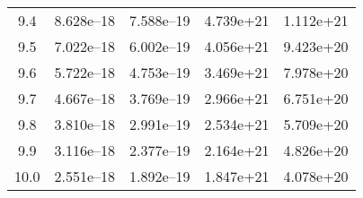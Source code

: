 \documentclass[a4paper,fleqn,usenatbib]{mnras}
\begin{document}
\begin{table*}
\begin{tabular}{ccccc}
    9.4 & 8.628e--18 & 7.588e--19 & 4.739e+21 & 1.112e+21 \\
    9.5 & 7.022e--18 & 6.002e--19 & 4.056e+21 & 9.423e+20 \\
    9.6 & 5.722e--18 & 4.753e--19 & 3.469e+21 & 7.978e+20 \\
    9.7 & 4.667e--18 & 3.769e--19 & 2.966e+21 & 6.751e+20 \\
    9.8 & 3.810e--18 & 2.991e--19 & 2.534e+21 & 5.709e+20 \\
    9.9 & 3.116e--18 & 2.377e--19 & 2.164e+21 & 4.826e+20 \\
    10.0 & 2.551e--18 & 1.892e--19 & 1.847e+21 & 4.078e+20 \\
    \hline
  \end{tabular}
\end{table*}
\end{document}
